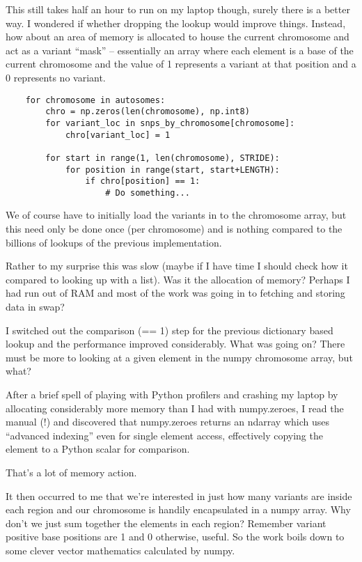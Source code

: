 This still takes half an hour to run on my laptop though, surely there
is a better way.  I wondered if whether dropping the lookup would improve
things. Instead, how about an area of memory is allocated to house the current
chromosome and act as a variant “mask” -- essentially an array where each element
is a base of the current chromosome and the value of 1 represents a variant at
that position and a 0 represents no variant.

\begin{verbatim}
    for chromosome in autosomes:
        chro = np.zeros(len(chromosome), np.int8)
        for variant_loc in snps_by_chromosome[chromosome]:
            chro[variant_loc] = 1

        for start in range(1, len(chromosome), STRIDE):
            for position in range(start, start+LENGTH):
                if chro[position] == 1:
                    # Do something...
\end{verbatim}

We of course have to initially load the variants in to the chromosome array,
but this need only be done once (per chromosome) and is nothing compared to the
billions of lookups of the previous implementation.

Rather to my surprise this was slow  (maybe if I have time I should
check how it compared to looking up with a list). Was it the allocation of
memory? Perhaps I had run out of RAM and most of the work was going in to
fetching and storing data in swap?

I switched out the comparison (== 1) step for the previous dictionary based
lookup and the performance improved considerably. What was going on? There must
be more to looking at a given element in the numpy chromosome array, but what?

After a brief spell of playing with Python profilers and crashing my laptop by
allocating considerably more memory than I had with numpy.zeroes, I read the
manual (!) and discovered that numpy.zeroes returns an ndarray which uses
“advanced indexing” even for single element access, effectively copying the
element to a Python scalar for comparison.

That’s a lot of memory action.

It then occurred to me that we’re interested in just how many variants are
inside each region and our chromosome is handily encapsulated in a numpy array.
Why don’t we just sum together the elements in each region? Remember variant
positive base positions are 1 and 0 otherwise, useful. So the work boils down
to some clever vector mathematics calculated by numpy.

